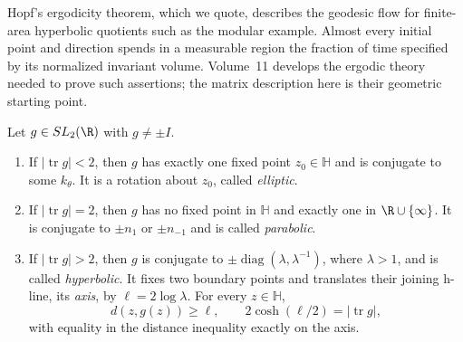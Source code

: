 Hopf's ergodicity theorem, which we quote, describes the geodesic flow for finite-area hyperbolic quotients such as the modular example. Almost every initial point and direction spends in a measurable region the fraction of time specified by its normalized invariant volume. Volume~11 develops the ergodic theory needed to prove such assertions; the matrix description here is their geometric starting point.

\begin{theorem}\label{thm:trace}
Let $g\in SL_2(\R)$ with $g\ne\pm I$.
\begin{enumerate}
\item[(a)] If $|\operatorname{tr}g|<2$, then $g$ has exactly one fixed point $z_0\in\mathbb H$ and is conjugate to some $k_\theta$. It is a rotation about $z_0$, called \emph{elliptic}.
\item[(b)] If $|\operatorname{tr}g|=2$, then $g$ has no fixed point in $\mathbb H$ and exactly one in $\R\cup\{\infty\}$. It is conjugate to $\pm n_1$ or $\pm n_{-1}$ and is called \emph{parabolic}.
\item[(c)] If $|\operatorname{tr}g|>2$, then $g$ is conjugate to $\pm\operatorname{diag}(\lambda,\lambda^{-1})$, where $\lambda>1$, and is called \emph{hyperbolic}. It fixes two boundary points and translates their joining h-line, its \emph{axis}, by $\ell=2\log\lambda$. For every $z\in\mathbb H$,
\[
d(z,g(z))\ge\ell,
\qquad 2\cosh(\ell/2)=|\operatorname{tr}g|,
\]
with equality in the distance inequality exactly on the axis.
\end{enumerate}
\end{theorem}

